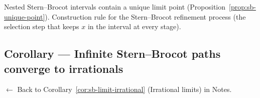 \begin{remark*}[Dependencies]
Nested Stern--Brocot intervals contain a unique limit point
(Proposition~\ref{prop:sb-unique-point}).
Construction rule for the Stern--Brocot refinement process (the selection
step that keeps $x$ in the interval at every stage).
\end{remark*}



\subsection*{Corollary --- Infinite Stern--Brocot paths converge to irrationals}
\label{prf:sb-limit-irrational}

\begin{remark*}[Return]
$\leftarrow$ Back to Corollary~\ref{cor:sb-limit-irrational} (Irrational limits) in Notes.
\end{remark*}

